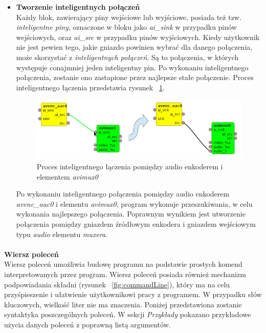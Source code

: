 \documentclass[12pt]{article}
\begin{document}
\begin{itemize}
\item \textbf{Tworzenie inteligentnych połączeń} \\
Każdy blok, zawierający piny wejściowe lub wyjściowe, posiada też tzw. \textit{inteligentne piny}, oznaczone w bloku jako \textit{ai\_sink} w przypadku pinów wejściowych, oraz \textit{ai\_src} w przypadku pinów wyjściowych. Kiedy użytkownik nie jest pewien tego, jakie gniazdo powinien wybrać dla danego połączenia, może skorzystać z \textit{inteligentnych połączeń}. Są to połączenia, w których występuje conajmniej jeden inteligentny pin. Po wykonaniu inteligentnego połączenia, zostanie ono zastapione przez najlepsze stałe połączenie. Proces inteligentnego łączenia przedstawia rysunek ~\ref{fig:aiConnectionProcess}. 
\begin{figure}[H]
  \includegraphics[width=150mm]{img/ai-connection-process.png}
  \caption{Proces inteligentnego łączenia pomiędzy audio enkoderem i elementem \textit{avimux0}}
  \label{fig:aiConnectionProcess}
\end{figure}
Po wykonaniu inteligentnego połączenia pomiędzy audio enkoderem \textit{avenc\_aac0} i elementu \textit{avimux0}, program wykonuje przeszukiwania, w celu wykonania najlepszego połączenia. Poprawnym wynikiem jest utworzenie połączenia pomiędzy gniazdem źródłowym enkodera i gniazdem wejściowym typu \textit{audio} elementu \textit{muxera}.
\end{itemize}\paragraph{}\vspace{-3mm}
\textbf{Wiersz poleceń} \\
Wiersz poleceń umożliwia budowę programu na podstawie prostych komend interpretowanych przez program. Wiersz poleceń posiada również mechanizm podpowiadania składni (rysunek ~\ref{fig:commandLine}), który ma na celu przyśpieszenie i ułatwienie użytkownikowi pracy z programem. W przypadku słów kluczowych, wielkość liter nie ma znaczenia. Poniżej przedstawiona zostanie syntaktyka poszczególnych poleceń. W sekcji \textit{Przykłady} pokazano przykładowe użycia danych poleceń z poprawną listą argumentów. 
\end{document}
